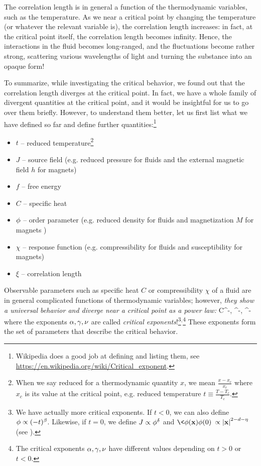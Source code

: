 \documentclass[12pt]{article}
\numberwithin{equation}{section}
\begin{document}
The correlation length is in general a function of the thermodynamic variables, such as the temperature. As we near a critical point by changing the temperature (or whatever the relevant variable is), the correlation length increases: in fact, at the critical point itself, the correlation length becomes infinity. Hence, the interactions in the fluid becomes long-ranged, and the fluctuations become rather strong, scattering various wavelengths of light and turning the substance into an opaque form!

To summarize, while investigating the critical behavior, we found out that the correlation length diverges at the critical point. In fact, we have a whole family of divergent quantities at the critical point, and it would be insightful for us to go over them briefly. However, to understand them better, let us first list what we have defined so far and define further quantities:\footnote{Wikipedia does a good job at defining and listing them, see \hyperref{https://en.wikipedia.org/wiki/Critical\_exponent}{}{}{https://en.wikipedia.org/wiki/Critical\_exponent}.}
\begin{multicols}{2}
	\begin{itemize}
		\item $t$ -- reduced temperature\footnote{When we say reduced for a thermodynamic quantity $x$, we mean $\frac{x-x_c}{x_c}$ where $x_c$ is its value at the critical point, e.g. reduced temperature $t\equiv\frac{T-T_c}{T_c}$.}
		\item $J$ -- source field (e.g. reduced pressure for fluids and the external magnetic field $h$ for magnets)
		\item $f$ -- free energy
		\item $C$ -- specific heat
		\item $\phi$ -- order parameter (e.g. reduced density for fluids and magnetization $M$ for magnets )
		\item $\chi$ -- response function (e.g. compressibility for fluids and susceptibility for magnets)
		\item $\xi$ -- correlation length
	\end{itemize}
\end{multicols}

Observable parameters such as specific heat $C$ or compressibility $\chi$ of a fluid are in general complicated functions of thermodynamic variables; however, \emph{they show a universal behavior and diverge near a critical point as a power law:}
\be 
C\propto{}^{-\a}\;,\quad 
\chi\propto{}^{-\g}\;,\quad 
\xi\propto{}^{-\nu}\; 
\ee 
where the exponents $\alpha,\gamma,\nu$ are called \emph{critical exponents}!\footnote{
We have actually more critical exponents. If $t<0$, we can also define $\phi\propto(-t)^{\beta}$. Likewise, if $t=0$, we define $J\propto\phi^{\delta}$ and $\<\f(\bx)\f(0)\>\propto\abs{\bx}^{2-d-\eta}$ (see ).
}$^{,}$\footnote{The critical exponents $\alpha,\gamma,\nu$ have different values depending on $t>0$ or $t<0$.} These exponents form the set of parameters that describe the critical behavior.
\end{document}
